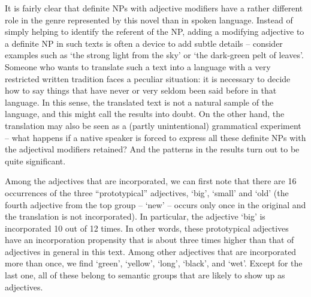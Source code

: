 {%

It is fairly clear that definite NPs with adjective modifiers have a rather different role in the genre represented by this novel than in spoken language. Instead of simply helping to identify the referent of the NP, adding a modifying adjective to a definite NP in such texts is often a device to add subtle details – consider examples such as  ‘the strong light from the sky’ or  ‘the dark-green pelt of leaves’. Someone who wants to translate such a text into a language with a very restricted written tradition faces a peculiar situation: it is necessary to decide how to say things that have never or very seldom been said before in that language. In this sense, the translated text is not a natural sample of the language, and this might call the results into doubt. On the other hand, the translation may also be seen as a (partly unintentional) grammatical experiment – what happens if a native speaker is forced to express all these definite NPs with the adjectival modifiers retained? And the patterns in the results turn out to be quite significant.


Among the adjectives that are incorporated, we can first note that there are 16 occurrences of the three “prototypical” adjectives,  ‘big’,  ‘small’ and ‘old’ (the fourth adjective from the top group –  ‘new’ – occurs only once in the original and the translation is not incorporated). In particular, the adjective  ‘big’ is incorporated 10 out of 12 times. In other words, these prototypical adjectives have an incorporation propensity that is about three times higher than that of adjectives in general in this text. Among other adjectives that are incorporated more than once, we find  ‘green’,  ‘yellow’,  ‘long’,  ‘black’, and  ‘wet’. Except for the last one, all of these belong to semantic groups that are likely to show up as adjectives.

}
